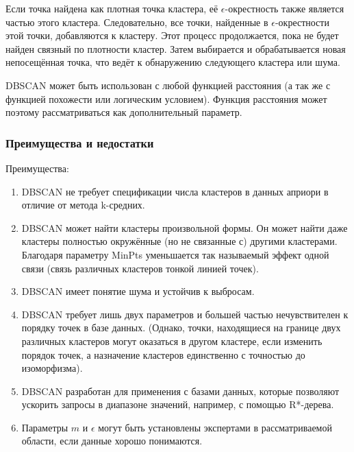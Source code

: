 \documentclass[bachelor, och, referat]{SCWorks}
\begin{document}
Если точка найдена как плотная точка кластера, её 
$\epsilon$-окрестность также является частью этого кластера. Следовательно, все точки, найденные в 
$\epsilon$-окрестности этой точки, добавляются к кластеру. Этот процесс продолжается, пока не будет найден связный по плотности кластер. Затем выбирается и обрабатывается новая непосещённая точка, что ведёт к обнаружению следующего кластера или шума.

DBSCAN может быть использован с любой функцией расстояния (а так же с функцией похожести или логическим условием). Функция расстояния может поэтому рассматриваться как дополнительный параметр.

\subsubsection{Преимущества и недостатки}
Преимущества:
\begin{enumerate}
    \item DBSCAN не требует спецификации числа кластеров в данных априори в отличие от метода k-средних.
    \item DBSCAN может найти кластеры произвольной формы. Он может найти даже кластеры полностью окружённые (но не связанные с) другими кластерами. Благодаря параметру MinPts уменьшается так называемый эффект одной связи (связь различных кластеров тонкой линией точек).
    \item DBSCAN имеет понятие шума и устойчив к выбросам.
    \item DBSCAN требует лишь двух параметров и большей частью нечувствителен к порядку точек в базе данных. (Однако, точки, находящиеся на границе двух различных кластеров могут оказаться в другом кластере, если изменить порядок точек, а назначение кластеров единственно с точностью до изоморфизма).
    \item DBSCAN разработан для применения с базами данных, которые позволяют ускорить запросы в диапазоне значений, например, с помощью R*-дерева.
    \item Параметры $m$ и $\epsilon$ могут быть установлены экспертами в рассматриваемой области, если данные хорошо понимаются.
\end{enumerate}
\end{document}
